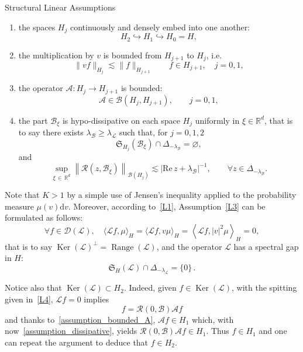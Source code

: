 \documentclass[AHL,Unicode,longabstracts,published]{cedram}
\DeclareMathOperator{\range}{Range}
\DeclareMathOperator{\nul}{Ker}
\renewcommand{\d}{\mathrm{d}}
\newcommand{\re}{\mathrm{Re}\,}
\newcommand{\R}{\mathbb{R}}
\newcommand{\fkS}{\mathfrak{S}}
\renewcommand{\AA}{\mathcal{A}}
\newcommand{\BB}{\mathcal{B}}
\newcommand{\LL}{\mathcal{L}}
\newcommand{\RR}{\mathcal{R}}
\newcommand{\dom}{\mathscr{D}}
\newcommand{\BBB}{\mathscr{B}}
\newcommand{\Ss}{H}
\renewcommand*\geq{\geqslant}
\let\oldforall\forall
\renewcommand*{\forall}{\mathrel{\oldforall}}
\begin{document}
\begin{enonce}{Structural Linear Assumptions}
\begin{enumerate}
\begin{enumerate}
\item \label{assumption_hierarchy}
the spaces $\Ss_j$ continuously and densely embed into one another:
\[
\Ss_{2} \hookrightarrow \Ss_1 \hookrightarrow \Ss_0 = \Ss,
\]
\item \label{assumption_multi-v}
the multiplication by $v$ is bounded from $\Ss_{j+1}$ to $\Ss_{j}$, i.e.
\begin{equation*}
\|v f\|_{\Ss_{j}} \lesssim \|f\|_{\Ss_{j+1}} \qquad f \in \Ss_{j+1}, \quad j=0,1,
\end{equation*}
\item \label{assumption_bounded_A}
the operator $\AA : \Ss_j \rightarrow \Ss_{j+1}$ is bounded:
\[
\AA \in \BBB\left(\Ss_j,\Ss_{j+1}\right), \qquad j=0,1,
\]
\item \label{assumption_dissipative}
the part $\BB_{\xi}$ is hypo-dissipative on each space $\Ss_j$ uniformly in $\xi \in \R^d$, that is to say there exists $\lambda_\BB \geq \lambda_{\LL}$ such that, for $j=0,1,2$
\[
\fkS_{\Ss_{j}}(\BB_{\xi}) \cap \Delta_{-\lambda_\BB} = \varnothing,
\]
and
\[
\sup_{\xi\,\in\,\R^{d}}
\left\| \RR(z,\BB_{\xi})\right\|_{\BBB(\Ss_j)} \lesssim | \re z + \lambda_{\BB}|^{-1}, \qquad \forall z \in \Delta_{-\lambda_{\BB}}.
\]
\end{enumerate}
\end{enumerate}
\end{enonce}
\begin{rema}
Note that $K > 1$ by a simple use of Jensen's inequality applied to the probability measure $\mu(v)\d v$. Moreover, according to~\eqref{L1}, Assumption~\eqref{L3} can be formulated as follows:
\begin{equation*}
\forall f \in \dom(\LL), \quad \langle \LL f, \mu \rangle_{\Ss} = \langle \LL f, v \mu \rangle_{\Ss} = \left\langle \LL f, |v|^2 \mu \right\rangle_{\Ss} = 0,
\end{equation*}
that is to say $\nul(\LL)^{\perp}=\range(\LL)$, and the operator $\LL$ has a spectral gap in $\Ss$:
\begin{equation*}
\fkS_{\Ss}(\LL) \cap \Delta_{-\lambda_\LL} = \{0\}\,.
\end{equation*}
\end{rema}
\begin{rema}\label{rem:KernelH2}
Notice also that $\nul(\LL) \subset \Ss_2$. Indeed, given $f \in \nul(\LL)$, with the spitting given in~\eqref{L4}, $\LL f=0$ implies
\[
f=\RR(0,\BB)\AA f
\]
and thanks to~\eqref{assumption_bounded_A}, $\AA f \in \Ss_1$ which, with now~\eqref{assumption_dissipative}, yields $\RR(0,\BB)\AA f\in \Ss_1.$ Thus $f \in \Ss_1$ and one can repeat the argument to deduce that $f \in \Ss_2$.
\end{rema}
\end{document}
